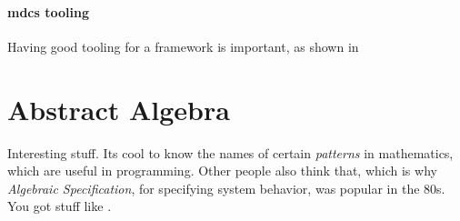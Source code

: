 \paragraph{\gls{mdcs} tooling} Having good tooling for a framework is important,
as shown in \cite{toolMcds}


\section{Abstract Algebra}

Interesting stuff. Its cool to know the names of certain \textit{patterns} in
mathematics, which are useful in programming. Other people also think that,
which is why \textit{Algebraic Specification}, for specifying system behavior,
was popular in the 80s. You got stuff like \cite{cafeObj}.
